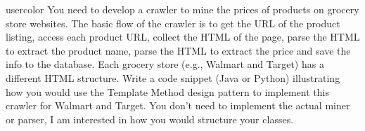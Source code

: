 \begin{chatquest}{usercolor}{}
You need to develop a crawler to mine the prices of products on grocery store websites. The basic flow of the crawler is to get the URL of the product listing, access each product URL, collect the HTML of the page, parse the HTML to extract the product name, parse the HTML to extract the price and save the info to the database. Each grocery store (e.g., Walmart and Target) has a different HTML structure. 
Write a code snippet (Java or Python) illustrating how you would use the Template Method design pattern to implement this crawler for Walmart and Target.
You don't need to implement the actual miner or parser, I am interested in how you would structure your classes.
\end{chatquest}

